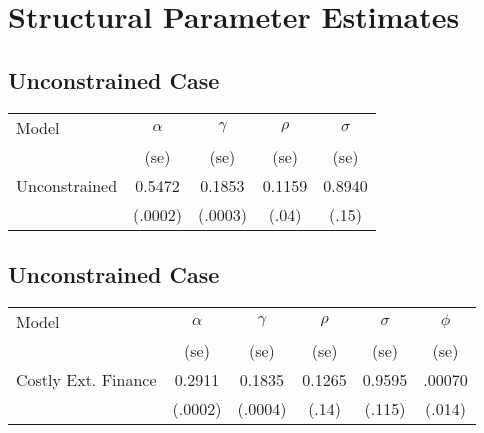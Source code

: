 \documentclass{article}
\begin{document}
\section{Structural Parameter Estimates}
\subsection{Unconstrained Case}

\begin{center}
\begin{tabular}{l | c c c c}
Model & $\alpha$ & $\gamma$ & $\rho$ & $\sigma$\\
 & \tiny{(se)} & \tiny{(se)} & \tiny{(se)} & \tiny{(se)}\\
 \hline
Unconstrained & 0.5472 & 0.1853 & 0.1159 & 0.8940\\
 & \tiny{(.0002)} & \tiny{(.0003)} & \tiny{(.04)} & \tiny{(.15)}\\
\hline
\end{tabular}
\end{center}


\subsection{Unconstrained Case}

\begin{center}
\begin{tabular}{l | c c c c c}
Model & $\alpha$ & $\gamma$ & $\rho$ & $\sigma$ & $\phi$ \\
 & \tiny{(se)} & \tiny{(se)} & \tiny{(se)} & \tiny{(se)} & \tiny{(se)}\\
 \hline
Costly Ext. Finance & 0.2911 & 0.1835 & 0.1265 & 0.9595 & .00070\\
 & \tiny{(.0002)} & \tiny{(.0004)} & \tiny{(.14)} & \tiny{(.115)} & \tiny{(.014)}\\
\hline
\end{tabular}
\end{center}
\end{document}
